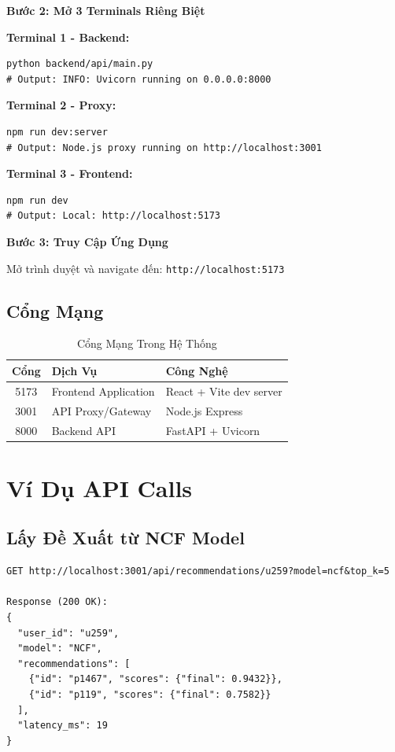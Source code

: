 \documentclass[12pt,a4paper]{article}
\begin{document}
\textbf{Bước 2: Mở 3 Terminals Riêng Biệt}

\textbf{Terminal 1 - Backend:}
\begin{lstlisting}
python backend/api/main.py
# Output: INFO: Uvicorn running on 0.0.0.0:8000
\end{lstlisting}

\textbf{Terminal 2 - Proxy:}
\begin{lstlisting}
npm run dev:server
# Output: Node.js proxy running on http://localhost:3001
\end{lstlisting}

\textbf{Terminal 3 - Frontend:}
\begin{lstlisting}
npm run dev
# Output: Local: http://localhost:5173
\end{lstlisting}

\textbf{Bước 3: Truy Cập Ứng Dụng}

Mở trình duyệt và navigate đến: \texttt{http://localhost:5173}

\subsection{Cổng Mạng}

\begin{table}[H]
\centering
\begin{tabular}{|c|l|l|}
\hline
\textbf{Cổng} & \textbf{Dịch Vụ} & \textbf{Công Nghệ} \\
\hline
5173 & Frontend Application & React + Vite dev server \\
3001 & API Proxy/Gateway & Node.js Express \\
8000 & Backend API & FastAPI + Uvicorn \\
\hline
\end{tabular}
\caption{Cổng Mạng Trong Hệ Thống}
\end{table}

\section{Ví Dụ API Calls}

\subsection{Lấy Đề Xuất từ NCF Model}

\begin{lstlisting}
GET http://localhost:3001/api/recommendations/u259?model=ncf&top_k=5

Response (200 OK):
{
  "user_id": "u259",
  "model": "NCF",
  "recommendations": [
    {"id": "p1467", "scores": {"final": 0.9432}},
    {"id": "p119", "scores": {"final": 0.7582}}
  ],
  "latency_ms": 19
}
\end{lstlisting}
\end{document}
